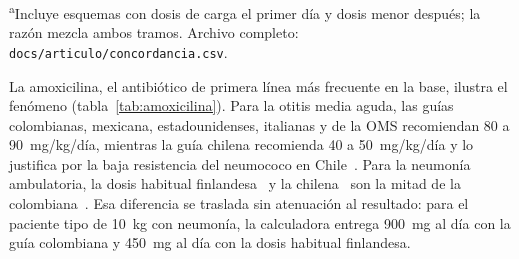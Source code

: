 \documentclass[11pt,a4paper]{article}
\newcommand{\codigo}[1]{\texttt{\small #1}}
\begin{document}
\begin{table}[htbp]
\vspace{2pt}
\begin{minipage}{0.92\textwidth}\footnotesize
\textsuperscript{a}Incluye esquemas con dosis de carga el primer día y dosis menor después; la razón mezcla ambos tramos. Archivo completo: \codigo{docs/articulo/concordancia.csv}.
\end{minipage}
\end{table}

La amoxicilina, el antibiótico de primera línea más frecuente en la base, ilustra el fenómeno (tabla~\ref{tab:amoxicilina}). Para la otitis media aguda, las guías colombianas, mexicana, estadounidenses, italianas y de la OMS recomiendan 80 a 90~mg/kg/día, mientras la guía chilena recomienda 40 a 50~mg/kg/día y lo justifica por la baja resistencia del neumococo en Chile~\citep{chileoma2019}. Para la neumonía ambulatoria, la dosis habitual finlandesa~\citep{backman2025} y la chilena~\citep{chilenac2019} son la mitad de la colombiana~\citep{gpc42,aiepi2012}. Esa diferencia se traslada sin atenuación al resultado: para el paciente tipo de 10~kg con neumonía, la calculadora entrega 900~mg al día con la guía colombiana y 450~mg al día con la dosis habitual finlandesa.
\end{document}
